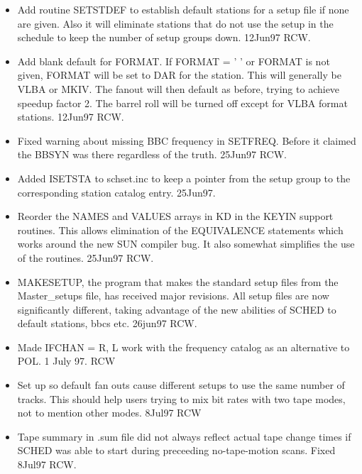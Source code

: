 \documentclass{report}
\begin{document}
\begin{itemize}
\item Add routine SETSTDEF to establish default stations for a setup
      file if none are given.  Also it will eliminate stations that
      do not use the setup in the schedule to keep the number of
      setup groups down.  12Jun97  RCW.

\item Add blank default for FORMAT.  If FORMAT = ' ' or FORMAT is not
      given, FORMAT will be set to DAR for the station.  This will
      generally be VLBA or MKIV.  The fanout will then default as
      before, trying to achieve speedup factor 2.  The barrel roll
      will be turned off except for VLBA format stations. 12Jun97 RCW.

\item Fixed warning about missing BBC frequency in SETFREQ.  Before it
      claimed the BBSYN was there regardless of the truth.  25Jun97 RCW.

\item Added ISETSTA to schset.inc to keep a pointer from the setup
      group to the corresponding station catalog entry.  25Jun97.

\item Reorder the NAMES and VALUES arrays in KD in the KEYIN support
      routines.  This allows elimination of the EQUIVALENCE statements
      which works around the new SUN compiler bug.  It also somewhat
      simplifies the use of the routines.   25Jun97 RCW.

\item MAKESETUP, the program that makes the standard setup files from
      the Master\_setups file, has received major revisions.  All
      setup files are now significantly different, taking advantage
      of the new abilities of SCHED to default stations, bbcs etc.
      26jun97 RCW.

\item Made IFCHAN = R, L work with the frequency catalog as an
      alternative to POL.  1 July 97. RCW

\item Set up so default fan outs cause different setups to use the
      same number of tracks.  This should help users trying to mix
      bit rates with two tape modes, not to mention other modes.
      8Jul97 RCW

\item Tape summary in .sum file did not always reflect actual
      tape change times if SCHED was able to start during preceeding
      no-tape-motion scans.  Fixed 8Jul97  RCW.


\end{itemize}
\end{document}

